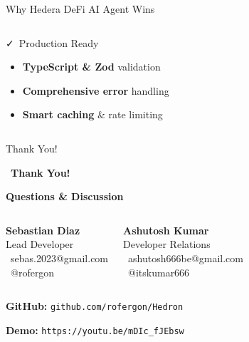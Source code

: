 \documentclass[aspectratio=169]{beamer}
\providecommand{\faCheckDouble}{\faCheck}
\begin{document}
\begin{frame}{Why Hedera DeFi AI Agent Wins}
\begin{columns}
\begin{block}{\faCheckDouble\ Production Ready}
\begin{itemize}
\item \textbf{TypeScript \& Zod} validation
\item \textbf{Comprehensive error} handling
\item \textbf{Smart caching} \& rate limiting
\end{itemize}
\end{block}
\end{columns}
\end{frame}

\begin{frame}{Thank You!}
\begin{center}
\large \faHeart\ \textbf{Thank You!}

\vspace{0.2cm}

\small \textbf{Questions \& Discussion}

\vspace{0.3cm}

\begin{columns}
\hspace{2.5cm}
\textbf{\footnotesize Sebastian Diaz}\\
\vspace{0.05cm}
\footnotesize Lead Developer\\
\vspace{0.05cm}
\footnotesize \faEnvelope\ sebas.2023@gmail.com\\
\footnotesize \faGithub\ @rofergon

\textbf{\footnotesize Ashutosh Kumar}\\
\vspace{0.05cm}
\footnotesize Developer Relations\\
\vspace{0.05cm}
\footnotesize \faEnvelope\ ashutosh666be@gmail.com
\\
\footnotesize \faGithub\ @itskumar666
\end{columns}

\vspace{0.3cm}

\textbf{\footnotesize GitHub:} \hspace{0.2cm} \texttt{\footnotesize github.com/rofergon/Hedron}

\vspace{0.1cm}

\textbf{\footnotesize Demo:} \texttt{\footnotesize https://youtu.be/mDIc\_fJEbsw}
\end{center}
\end{frame}
\end{document}
